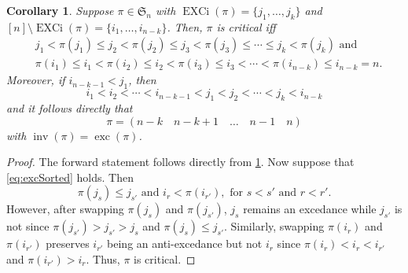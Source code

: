 \documentclass[reqno]{amsart}
\newtheorem{corollary}[theorem]{Corollary}
\theoremstyle{definition}
\newcommand{\symS}{\mathfrak{S}}
\DeclareMathOperator{\inv}{inv}
\DeclareMathOperator{\exc}{exc}
\DeclareMathOperator{\EXCi}{EXCi}
\begin{document}
\begin{corollary}\label{cor:critical}
	Suppose $\pi\in\symS_n$ with $\EXCi(\pi)=\{j_1,\dotsc,j_k\}$ and $[n]\setminus\EXCi(\pi)=\{i_1,\dotsc,i_{n-k}\}$. Then, $\pi$ is critical iff 
	\begin{equation}\label{eq:excSorted}
		\begin{aligned}
			&j_1 < \pi(j_1) \leq j_2 < \pi(j_2) \leq j_3 < \pi(j_3) \leq \dotsb \leq j_k< \pi(j_k)\text{ and} \\
			&\pi(i_1) \leq i_1 < \pi(i_2) \leq i_2 < \pi(i_3) \leq i_3 <\dotsb < \pi(i_{n-k}) \leq i_{n-k}=n.
		\end{aligned}
	\end{equation}
Moreover, if $i_{n-k-1}<j_1$, then 
\[
i_1 < i_2< \dotsb < i_{n-k-1}<j_1<j_2 < \dotsb < j_k <i_{n-k}
\]
and it follows directly that 
\begin{equation}\label{eq:specialCase}
	\pi = (n-k\quad n-k+1 \quad \dotsc \quad n-1\quad  n)
\end{equation}
with $\inv(\pi)=\exc(\pi)$.
\end{corollary}
\begin{proof}
	The forward statement follows directly from \cref{cor:critical}. Now suppose that \eqref{eq:excSorted} holds. Then 
	\[
	\pi(j_s)\leq j_{s'}\text{ and } i_r< \pi(i_{r'}),\text{ for }s<s'\text{ and }r<r'.
	\] 
	However, after swapping $\pi(j_s)$ and $\pi(j_{s'})$, $j_{s}$ remains an excedance while $j_{s'}$ is not since $\pi(j_{s'})> j_{s'}>j_s$ and $\pi(j_s)\leq j_{s'}$. Similarly, swapping $\pi(i_r)$ and $\pi(i_{r'})$ preserves $i_{r'}$ being an anti-excedance but not $i_{r}$ since $\pi(i_{r})< i_{r}<i_{r'}$ and $\pi(i_{r'})> i_{r}$. Thus, $\pi$ is critical.
\end{proof}
\end{document}
